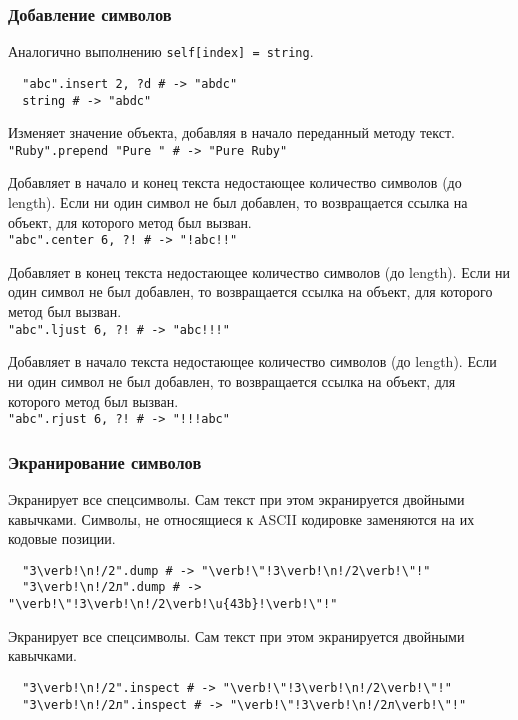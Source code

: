\subsubsection*{Добавление символов}

\begin{methodlist}
  Аналогично выполнению \verb!self[index] = string!.
  \begin{verbatim}
  "abc".insert 2, ?d # -> "abdc"
  string # -> "abdc"
  \end{verbatim}

  Изменяет значение объекта, добавляя в начало переданный методу текст.
  \\\verb!"Ruby".prepend "Pure " # -> "Pure Ruby"!

  Добавляет в начало и конец текста недостающее количество символов (до length). Если ни один символ не был добавлен, то возвращается ссылка на объект, для которого метод был вызван.
  \\\verb|"abc".center 6, ?! # -> "!abc!!"|

  Добавляет в конец текста недостающее количество символов (до length). Если ни один символ не был добавлен, то возвращается ссылка на объект, для которого метод был вызван.
  \\\verb|"abc".ljust 6, ?! # -> "abc!!!"|

  Добавляет в начало текста недостающее количество символов (до length). Если ни один символ не был добавлен, то возвращается ссылка на объект, для которого метод был вызван.
  \\\verb|"abc".rjust 6, ?! # -> "!!!abc"|
\end{methodlist}

\subsubsection*{Экранирование символов}

\begin{methodlist}
  Экранирует все спецсимволы. Сам текст при этом экранируется двойными кавычками. Символы, не относящиеся к ASCII кодировке заменяются на их кодовые позиции.
  \begin{verbatim}
  "3\verb!\n!/2".dump # -> "\verb!\"!3\verb!\n!/2\verb!\"!"
  "3\verb!\n!/2л".dump # -> "\verb!\"!3\verb!\n!/2\verb!\u{43b}!\verb!\"!"
  \end{verbatim}

  Экранирует все спецсимволы. Сам текст при этом экранируется двойными кавычками.
  \begin{verbatim}
  "3\verb!\n!/2".inspect # -> "\verb!\"!3\verb!\n!/2\verb!\"!"
  "3\verb!\n!/2л".inspect # -> "\verb!\"!3\verb!\n!/2л\verb!\"!"
  \end{verbatim}
\end{methodlist}

